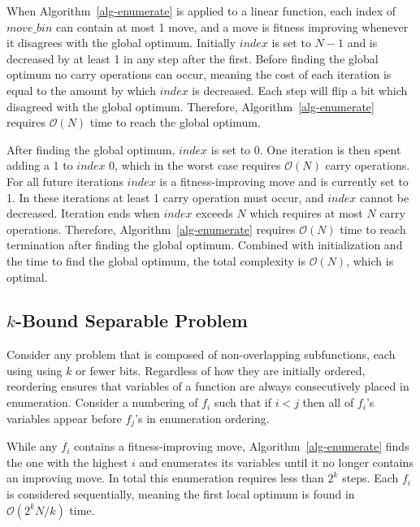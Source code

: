 \documentclass[runningheads,a4paper]{llncs}
\newcommand{\BigO}[1]{$\mathcal{O}{(#1)}$}
\begin{document}
When Algorithm~\ref{alg-enumerate} is applied to a linear
function, each index of $move\_bin$ can contain at most 1
move, and a move is fitness improving whenever it disagrees with the global optimum.
Initially $index$ is set to $N-1$ and is decreased by at least 1 in any step after the first.
Before finding the global optimum no carry operations can occur, meaning the
cost of each iteration is equal to the amount by which $index$ is decreased.
Each step will flip a bit which disagreed with the global optimum.
Therefore, Algorithm~\ref{alg-enumerate} requires \BigO{N} time to reach
the global optimum.

After finding the global optimum, $index$ is set to 0. One iteration
is then spent adding a 1 to $index$ 0, which in the worst case requires \BigO{N}
carry operations. For all future iterations $index$ is a fitness-improving move
and is currently set to 1. In these iterations at least 1 carry operation must
occur, and $index$ cannot be decreased. Iteration ends when $index$ exceeds $N$
which requires at most $N$ carry operations. Therefore, Algorithm~\ref{alg-enumerate}
requires \BigO{N} time to reach termination after finding the global optimum. Combined
with initialization and the time to find the global optimum, the total complexity is \BigO{N},
which is optimal.

\subsection{$k$-Bound Separable Problem}
Consider any problem that is composed of non-overlapping
subfunctions, each using using $k$ or fewer bits. Regardless
of how they are initially ordered, reordering ensures that
variables of a function are always consecutively placed in enumeration.
Consider a numbering of $f_i$ such that if $i < j$ then all of $f_i$'s
variables appear before $f_j$'s in enumeration ordering.

While any $f_i$ contains a fitness-improving move, Algorithm~\ref{alg-enumerate}
finds the one with the highest $i$ and enumerates its variables until it no longer
contains an improving move. In total this enumeration requires less than $2^k$
steps. Each $f_i$ is considered sequentially, meaning the first local optimum
is found in \BigO{2^kN/k} time.
\end{document}
